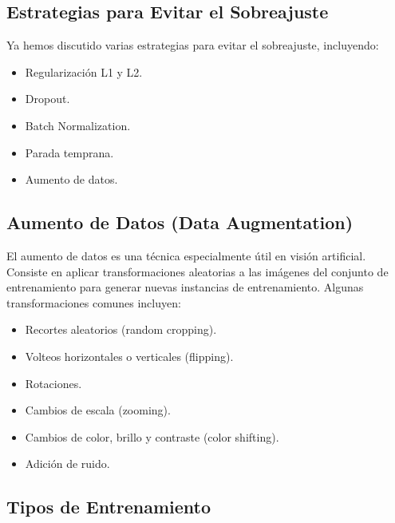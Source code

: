 \documentclass{article}
\begin{document}
\subsection{Estrategias para Evitar el Sobreajuste}

Ya hemos discutido varias estrategias para evitar el sobreajuste, incluyendo:

\begin{itemize}
    \item Regularización L1 y L2.
    \item Dropout.
    \item Batch Normalization.
    \item Parada temprana.
    \item Aumento de datos.
\end{itemize}

\subsection{Aumento de Datos (Data Augmentation)}

El aumento de datos es una técnica especialmente útil en visión artificial.  Consiste en aplicar transformaciones aleatorias a las imágenes del conjunto de entrenamiento para generar nuevas instancias de entrenamiento.  Algunas transformaciones comunes incluyen:

\begin{itemize}
    \item Recortes aleatorios (random cropping).
    \item Volteos horizontales o verticales (flipping).
    \item Rotaciones.
    \item Cambios de escala (zooming).
    \item Cambios de color, brillo y contraste (color shifting).
    \item Adición de ruido.
\end{itemize}

\subsection{Tipos de Entrenamiento}
\end{document}
